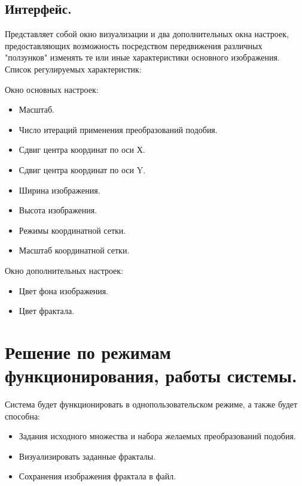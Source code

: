 \documentclass[a4paper,12pt,preview]{report} %
\begin{document}
	\subsection{Интерфейс.}
		
		Представляет собой окно визуализации и два дополнительных окна настроек, предоставляющих возможность посредством передвижения различных "ползунков" изменять те или иные характеристики основного изображения. Список регулируемых характеристик:
		
		Окно основных настроек:
		
		\begin{itemize}
			\item Масштаб.
			\item Число итераций применения преобразований подобия.
			\item Сдвиг центра координат по оси Х.
			\item Сдвиг центра координат по оси Y.
			\item Ширина изображения.
			\item Высота изображения.
			\item Режимы координатной сетки.
			\item Масштаб координатной сетки.
		\end{itemize}
		
		Окно дополнительных настроек:
		
		\begin{itemize}
			\item Цвет фона изображения.
			\item Цвет фрактала.
		\end{itemize}
		
		
	
	\section{Решение по режимам функционирования, работы системы.}
	
	Система будет функционировать в однопользовательском режиме, а также будет способна:
	
	\begin{itemize}
		\item Задания исходного множества и набора желаемых преобразований подобия.
		\item Визуализировать заданные фракталы.
		\item Сохранения изображения фрактала в файл.
	\end{itemize}
	
\end{document}
